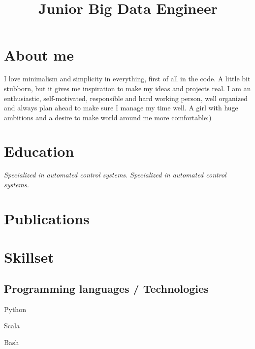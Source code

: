 \documentclass[12pt,a4paper,sans]{moderncv}        %
\title{Junior Big Data Engineer}                               %
\begin{document}
\makecvtitle
\section{About me}
\textcolor{color1}{I love minimalism and simplicity in everything, first of all in the code. A little bit stubborn, but it gives me inspiration to make my ideas and projects real. I am an enthusiastic, self-motivated, responsible and hard working person, well organized and always plan ahead to make sure I manage my time well. A girl with huge ambitions and a desire to make world around me more comfortable:)}
\section{Education}
\textit{Specialized in automated control systems.}  %
\textit{Specialized in automated control systems.} 

\section{Publications}
\section{Skillset}

\subsection{Programming languages / Technologies}

\begin{itemize}\setlength{\itemsep}{-5pt}%
\begin{multicols}{2}
\item Python
\item Scala 
\item Bash 
\end{multicols}
\end{itemize}
\end{document}

